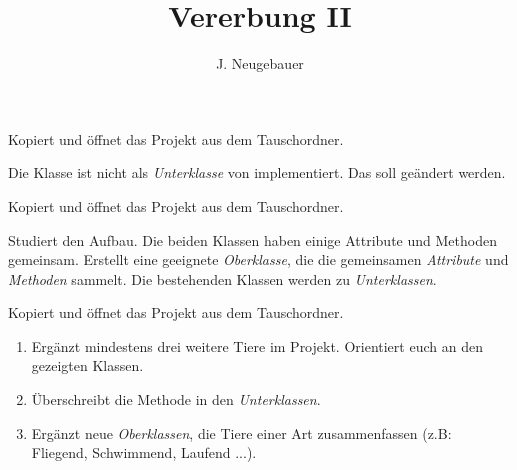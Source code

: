 \documentclass[10pt, a4paper]{scrartcl}
\author{J. Neugebauer}
\title{Vererbung II}
\date{\Heute}
\begin{document}
\ReiheTitel

\begin{aufgabe}
	Kopiert und öffnet das Projekt  aus dem Tauschordner.
	
	Die Klasse  ist nicht als \emph{Unterklasse} von  implementiert. Das soll geändert werden.
\end{aufgabe}

\begin{aufgabe}
	Kopiert und öffnet das Projekt  aus dem Tauschordner.
	
	Studiert den Aufbau. Die beiden Klassen haben einige Attribute und Methoden gemeinsam. Erstellt eine geeignete \emph{Oberklasse}, die die gemeinsamen \emph{Attribute} und \emph{Methoden} sammelt. Die bestehenden Klassen werden zu \emph{Unterklassen}.
\end{aufgabe}

\begin{aufgabe}
	Kopiert und öffnet das Projekt  aus dem Tauschordner.
	
	\begin{enumerate}
		\item Ergänzt mindestens drei weitere Tiere im Projekt. Orientiert euch an den gezeigten Klassen.
		\item Überschreibt die Methode  in den \emph{Unterklassen}.
		\item Ergänzt neue \emph{Oberklassen}, die Tiere einer Art zusammenfassen (z.B: Fliegend, Schwimmend, Laufend ...).
	\end{enumerate}
\end{aufgabe}
\end{document}
